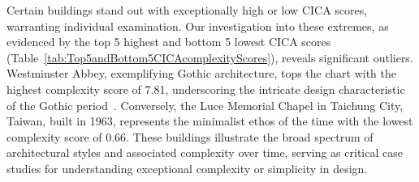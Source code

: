 Certain buildings stand out with exceptionally high or low CICA scores, warranting individual examination.
Our investigation into these extremes, as evidenced by the top 5 highest and bottom 5 lowest CICA scores (Table~\ref{tab:Top5andBottom5CICAcomplexityScores}), reveals significant outliers.
Westminster Abbey, exemplifying Gothic architecture, tops the chart with the highest complexity score of 7.81, underscoring the intricate design characteristic of the Gothic period~\cite{Kennedy2013}.
Conversely, the Luce Memorial Chapel in Taichung City, Taiwan, built in 1963, represents the minimalist ethos of the time with the lowest complexity score of 0.66.
These buildings illustrate the broad spectrum of architectural styles and associated complexity over time, serving as critical case studies for understanding exceptional complexity or simplicity in design.



